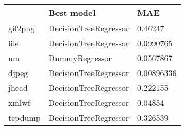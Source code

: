 \begin{tabular}{lll}
\toprule
{} &             Best model &         MAE \\
\midrule
gif2png &  DecisionTreeRegressor &     0.46247 \\
file    &  DecisionTreeRegressor &   0.0990765 \\
nm      &         DummyRegressor &   0.0567867 \\
djpeg   &  DecisionTreeRegressor &  0.00896336 \\
jhead   &  DecisionTreeRegressor &    0.222155 \\
xmlwf   &  DecisionTreeRegressor &     0.04854 \\
tcpdump &  DecisionTreeRegressor &    0.326539 \\
\bottomrule
\end{tabular}
